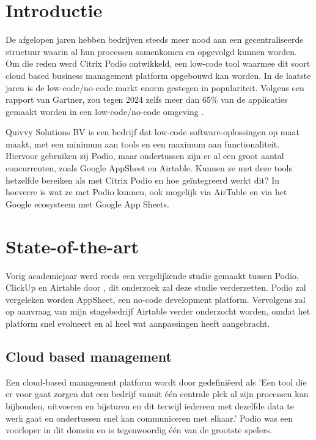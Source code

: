 
\section{Introductie}%
\label{sec:introductie}

De afgelopen jaren hebben bedrijven steeds meer nood aan een gecentraliseerde structuur waarin al hun processen samenkomen en opgevolgd kunnen worden. Om die reden werd Citrix Podio ontwikkeld, een low-code tool waarmee dit soort cloud based business management platform opgebouwd kan worden. In de laatste jaren is de low-code/no-code markt enorm gestegen in populariteit. Volgens een rapport van Gartner, zou tegen 2024 zelfs meer dan 65\% van de applicaties gemaakt worden in een low-code/no-code omgeving \autocite{Costello2021}.

Quivvy Solutions BV is een bedrijf dat low-code software-oplossingen op maat maakt, met een minimum aan tools en een maximum aan functionaliteit. Hiervoor gebruiken zij Podio, maar ondertussen zijn er al een groot aantal concurrenten, zoals Google AppSheet en Airtable. Kunnen ze met deze tools hetzelfde bereiken als met Citrix Podio en hoe geïntegreerd werkt dit? In hoeverre is wat ze met Podio kunnen, ook mogelijk via AirTable en via het Google ecosysteem met Google App Sheets.


\section{State-of-the-art}%
\label{sec:state-of-the-art}

 Vorig academiejaar werd reeds een vergelijkende studie gemaakt tussen Podio, ClickUp en Airtable door \textcite{Spitaels2022}, dit onderzoek zal deze studie verderzetten. Podio zal vergeleken worden  AppSheet, een no-code development platform. Vervolgens zal op aanvraag van mijn stagebedrijf Airtable verder onderzocht worden, omdat het platform snel evolueert en al heel wat aanpassingen heeft aangebracht.
 
\subsection{Cloud based management}

Een cloud-based management platform wordt door \textcite{Spitaels2022} gedefiniëerd als 'Een tool die er voor gaat zorgen dat een bedrijf vanuit één centrale plek al zijn processen kan bijhouden, uitvoeren en bijsturen en dit terwijl iedereen met dezelfde data te werk gaat en ondertussen snel kan communiceren met elkaar.'
Podio was een voorloper in dit domein en is tegenwoordig één van de grootste spelers.

